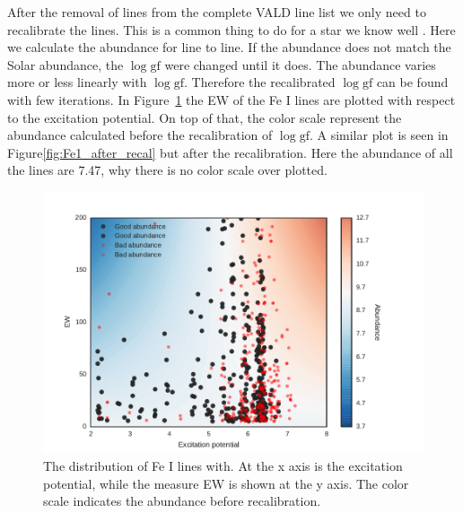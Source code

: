 \documentclass{aa}
\begin{document}
After the removal of lines from the complete VALD line list we
only need to recalibrate the lines. This is a common thing to do
for a star we know well \citep{2012Onehag}. Here we calculate the
abundance for line to line. If the abundance does not match the
Solar abundance, the $\log \mathrm{gf}$ were changed until it does.
The abundance varies more or less linearly with $\log \mathrm{gf}$.
Therefore the recalibrated $\log \mathrm{gf}$ can be found with few
iterations. In Figure~\ref{fig:Fe1_before_recal} the EW of the Fe I
lines are plotted with respect to the excitation potential. On top
of that, the color scale represent the abundance calculated before
the recalibration of $\log \mathrm{gf}$. A similar plot is seen in
Figure\ref{fig:Fe1_after_recal} but after the recalibration. Here the
abundance of all the lines are 7.47, why there is no color scale over
plotted.

\begin{figure}[htpb]
    \centering
    \includegraphics[width=0.9\linewidth]{figures/EWvsEP.pdf}
    \caption{The distribution of Fe I lines with. At the x axis is the
    excitation potential, while the measure EW is shown at the y axis. The
    color scale indicates the abundance before recalibration.}
    \label{fig:Fe1_before_recal}
\end{figure}
\end{document}
